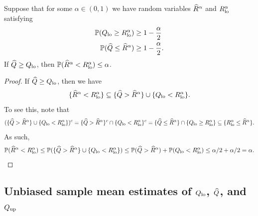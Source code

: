\begin{proposition}
Suppose that for some $\alpha \in (0, 1)$ we have random variables $\widehat{R}^{\alpha}$ and $R_{\mathrm{lo}}^{\alpha}$ satisfying
\begin{align}
    \mathbb{P}(Q_{\mathrm{lo}} \geq R_{\mathrm{lo}}^{\alpha}) &\geq 1 - \frac{\alpha}{2} \label{eq:qlo-confidence-interval-guarantee} \\
    \mathbb{P}(\widehat{Q} \leq \widehat{R}^{\alpha}) &\geq 1 - \frac{\alpha}{2} \label{eq:qt-confidence-interval-guarantee}.
\end{align}
If $\widehat{Q} \geq Q_{\mathrm{lo}}$, then $\mathbb{P}(\widehat{R}^{\alpha} < R_{\mathrm{lo}}^{\alpha}) \leq \alpha$.
\end{proposition}

\begin{proof}
If $\widehat{Q} \geq Q_{\mathrm{lo}}$, then we have
\[
    \{\widehat{R}^{\alpha} < R_{\mathrm{lo}}^{\alpha}\} \subseteq \{\widehat{Q} > \widehat{R}^{\alpha}\} \cup \{Q_{\mathrm{lo}} < R_{\mathrm{lo}}^{\alpha}\}.
\]
To see this, note that
\[
    (\{\widehat{Q} > \widehat{R}^{\alpha}\} \cup \{Q_{\mathrm{lo}} < R_{\mathrm{lo}}^{\alpha}\})^c
        = \{\widehat{Q} > \widehat{R}^{\alpha}\}^c \cap \{Q_{\mathrm{lo}} < R_{\mathrm{lo}}^{\alpha}\}^c
        = \{\widehat{Q} \leq \widehat{R}^{\alpha}\} \cap \{Q_{\mathrm{lo}} \geq R_{\mathrm{lo}}^{\alpha}\}
        \subseteq \{R_{\mathrm{lo}}^{\alpha} \leq \widehat{R}^{\alpha}\}.
\]
As such,
\begin{align*}
    \mathbb{P}(\widehat{R}^{\alpha} < R_{\mathrm{lo}}^{\alpha}) \leq \mathbb{P}(\{\widehat{Q} > \widehat{R}^{\alpha}\} \cup \{Q_{\mathrm{lo}} < R_{\mathrm{lo}}^{\alpha}\}) \leq \mathbb{P}(\widehat{Q} > \widehat{R}^{\alpha}) + \mathbb{P}(Q_{\mathrm{lo}} < R_{\mathrm{lo}}^{\alpha}) \leq \alpha/2 + \alpha/2 = \alpha.
\end{align*}
\end{proof}


\subsection{Unbiased sample mean estimates of $Q_{\mathrm{lo}}$, $\widehat{Q}$, and $Q_{\mathrm{up}}$} \label{sec:confidence-intervals-methodology-supplement}


